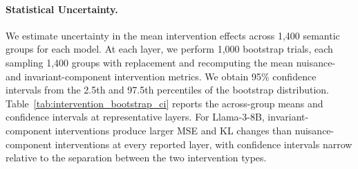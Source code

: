 \paragraph{Statistical Uncertainty.}
We estimate uncertainty in the mean intervention effects across
1,400 semantic groups for each model. At each layer, we perform
1,000 bootstrap trials, each sampling 1,400 groups with replacement
and recomputing the mean nuisance- and invariant-component
intervention metrics. We obtain 95\% confidence intervals from the
2.5th and 97.5th percentiles of the bootstrap distribution.
Table~\ref{tab:intervention_bootstrap_ci} reports the across-group
means and confidence intervals at representative layers.
For Llama-3-8B, invariant-component interventions produce larger
MSE and KL changes than nuisance-component interventions at every
reported layer, with confidence intervals narrow relative to
the separation between the two intervention types.



